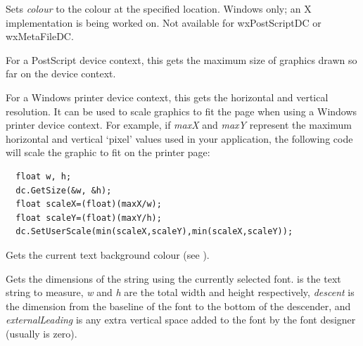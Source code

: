 

Sets {\it colour} to the colour at the specified location. Windows only; an X implementation
is being worked on. Not available for wxPostScriptDC or wxMetaFileDC.

\label{wxdcgetsize}


For a PostScript device context, this gets the maximum size of graphics
drawn so far on the device context.

For a Windows printer device context, this gets the horizontal and vertical
resolution. It can be used to scale graphics to fit the page when using
a Windows printer device context. For example, if {\it maxX} and {\it maxY}\rtfsp
represent the maximum horizontal and vertical `pixel' values used in your
application, the following code will scale the graphic to fit on the
printer page:

\begin{verbatim}
  float w, h;
  dc.GetSize(&w, &h);
  float scaleX=(float)(maxX/w);
  float scaleY=(float)(maxY/h);
  dc.SetUserScale(min(scaleX,scaleY),min(scaleX,scaleY));
\end{verbatim}



Gets the current text background colour (see ).

\label{wxdcgettextextent}


Gets the dimensions of the string using the currently selected font.
 is the text string to measure, {\it w} and {\it h} are
the total width and height respectively, {\it descent} is the
dimension from the baseline of the font to the bottom of the
descender, and {\it externalLeading} is any extra vertical space added
to the font by the font designer (usually is zero).

